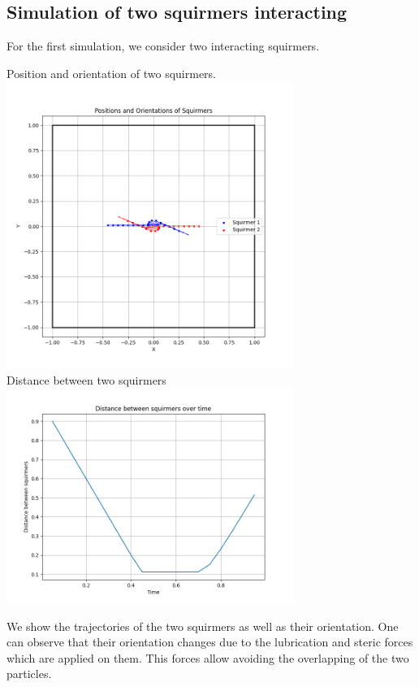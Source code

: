 \documentclass{article}
\begin{document}
\subsection{Simulation of two squirmers interacting}
For the first simulation, we consider two interacting squirmers.
\begin{center}
   Position and orientation of two squirmers.
   \includegraphics[width=0.7\textwidth]{graphs/squirmers_colliding.png}\\
   Distance between two squirmers
   \includegraphics[width=0.7\textwidth]{graphs/dist_squirmers_colliding.png}
\end{center}
We show the trajectories of the two squirmers as well as their orientation. 
One can observe that their  orientation changes due to the lubrication and steric forces which are applied on them. 
This forces allow avoiding the overlapping of the two particles.
\newpage

\nocite{*}


\end{document}

